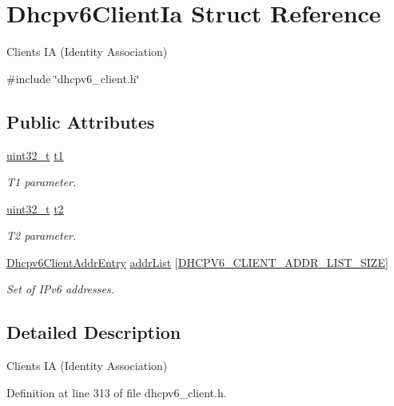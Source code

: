 \hypertarget{structDhcpv6ClientIa}{}\section{Dhcpv6\+Client\+Ia Struct Reference}
\label{structDhcpv6ClientIa}


Client\textquotesingle{}s IA (Identity Association)  




{\ttfamily \#include \char`\"{}dhcpv6\+\_\+client.\+h\char`\"{}}

\subsection*{Public Attributes}
\begin{DoxyCompactItemize}
\item 
\hyperlink{stdint_8h_a435d1572bf3f880d55459d9805097f62}{uint32\+\_\+t} \hyperlink{structDhcpv6ClientIa_a78ed99f2943499e065563dd35dd6c926}{t1}
\begin{DoxyCompactList}\small\item\em T1 parameter. \end{DoxyCompactList}\item 
\hyperlink{stdint_8h_a435d1572bf3f880d55459d9805097f62}{uint32\+\_\+t} \hyperlink{structDhcpv6ClientIa_ad93ce83f13052385ac51475baa097cf1}{t2}
\begin{DoxyCompactList}\small\item\em T2 parameter. \end{DoxyCompactList}\item 
\hyperlink{structDhcpv6ClientAddrEntry}{Dhcpv6\+Client\+Addr\+Entry} \hyperlink{structDhcpv6ClientIa_a08066618ff72f24acec5dfa47449b63e}{addr\+List} \mbox{[}\hyperlink{dhcpv6__client_8h_a50daf16fa24e452127eef9a801d8f576}{D\+H\+C\+P\+V6\+\_\+\+C\+L\+I\+E\+N\+T\+\_\+\+A\+D\+D\+R\+\_\+\+L\+I\+S\+T\+\_\+\+S\+I\+ZE}\mbox{]}
\begin{DoxyCompactList}\small\item\em Set of I\+Pv6 addresses. \end{DoxyCompactList}\end{DoxyCompactItemize}


\subsection{Detailed Description}
Client\textquotesingle{}s IA (Identity Association) 

Definition at line 313 of file dhcpv6\+\_\+client.\+h.




